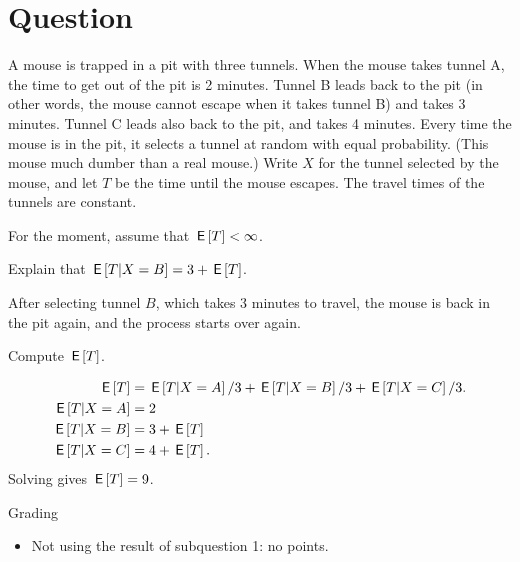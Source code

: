 \section*{Question}

A mouse is trapped in a pit with three tunnels.
When the mouse takes tunnel A, the time to get out of the pit is 2 minutes.
Tunnel B leads back to the pit (in other words, the mouse cannot escape when it takes tunnel B) and takes 3 minutes.
Tunnel C leads also back to the pit, and takes 4 minutes.
Every time the mouse is in the pit, it selects a tunnel at random with equal probability.
(This mouse much dumber than a real mouse.)
Write $X$ for the tunnel selected by the mouse, and let $T$ be the time until the mouse escapes.
The travel times of the tunnels are constant.

For the moment, assume that $\,\mathsf{E}\left[T\right] < \infty$.


\begin{exercise}[1]
  Explain that $\,\mathsf{E}\left[T|X=B\right] = 3 + \,\mathsf{E}\left[T\right]$.
\begin{solution}
After selecting tunnel $B$, which takes 3 minutes to travel, the mouse is back in the pit again, and the process starts over again.
\end{solution}
\end{exercise}


\begin{exercise}[1]
  Compute $\,\mathsf{E}\left[T\right]$.
\begin{solution}
    \begin{align}
\,\mathsf{E}\left[T\right] &= \,\mathsf{E}\left[T|X=A\right]/3 + \,\mathsf{E}\left[T|X=B\right]/3 + \,\mathsf{E}\left[T|X=C\right]/3.\\
\,\mathsf{E}\left[T|X=A\right] &= 2\\
\,\mathsf{E}\left[T|X=B\right] &= 3 + \,\mathsf{E}\left[T\right]\\
\,\mathsf{E}\left[T|X=C\right] &= 4 + \,\mathsf{E}\left[T\right].
    \end{align}
Solving gives $\,\mathsf{E}\left[T\right]=9$.

Grading
\begin{itemize}
\item Not using the result of subquestion 1: no points.
\end{itemize}
\end{solution}
\end{exercise}


